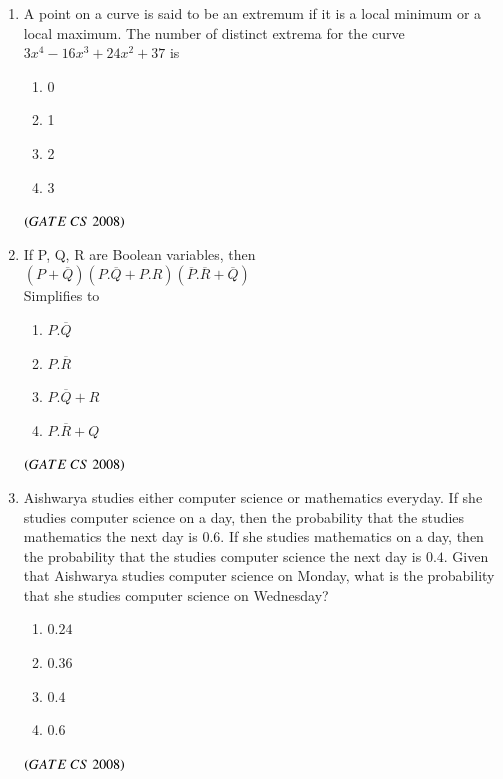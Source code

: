 \documentclass[journal, onecolumn]{IEEEtran}
\numberwithin{equation}{enumi}
\numberwithin{figure}{enumi}
\begin{document}
\begin{enumerate}
\item A point on a curve is said to be an extremum if it is a local minimum or a local maximum. The number of distinct extrema for the curve $3x^4-16x^3+24x^2+37$ is
\vspace{-0.5em}%
\begin{multicols}{4}
\begin{enumerate}
    \item  0
    \item  1
    \item  2
    \item  3
\end{enumerate}
\end{multicols}
\hfill $\left(GATE\ CS\  2008\right)$

\item If P, Q, R are Boolean variables, then \\
$(P+\overline{Q})(P.\overline{Q}+P.R)(\overline{P}.\overline{R}+\overline{Q})$\\
Simplifies  to
\vspace{-0.5em}%
\begin{multicols}{4}
\begin{enumerate}
    \item $P.\overline{Q}$
    \item $P.\overline{R}$
    \item $P.\overline{Q}+R$
    \item $P.\overline{R}+Q$
\end{enumerate}
\end{multicols}
\hfill $\left(GATE\ CS\  2008\right)$

\item Aishwarya studies either computer science or mathematics everyday. If she studies computer science on a day, then the probability that the studies mathematics the next day is $0.6$. If she studies mathematics on a day, then the probability that the studies computer science the next day is $0.4$. Given that Aishwarya studies computer science on Monday, what is the probability that she studies computer science on Wednesday?
\vspace{-1em}%
\begin{multicols}{4}
\begin{enumerate}
    \item $0.24$
    \item $0.36$
    \item $0.4$
    \item $0.6$
\end{enumerate}
\end{multicols}
\hfill $\left(GATE\ CS\  2008\right)$


\end{enumerate}
\end{document}
